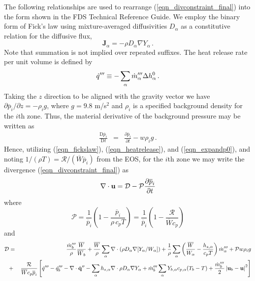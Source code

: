 The following relationships are used to rearrange (\ref{eqn_divconstraint_final}) into
the form shown in the FDS Technical Reference Guide. We employ the binary form of Fick's law using mixture-averaged diffusivities $D_\alpha$ as a constitutive relation for the diffusive flux,
\begin{equation}
\label{eqn_fickslaw}
\mathbf{J}_{\alpha} = - \rho D_\alpha \nabla Y_\alpha \,\mbox{.}
\end{equation}
Note that summation is not implied over repeated suffixes.
The heat release rate per unit volume is defined by
\begin{equation}
\label{eqn_heatrelease}
\dot{q}^{\prime\prime\prime} \equiv -\sum_\alpha \dot{m}_{\alpha}^{\prime\prime\prime} \Delta h^0_\alpha \,\mbox{.}
\end{equation}
Taking the $z$ direction to be aligned with the gravity vector we have $\partial \overline{p}_i/\partial z = -\rho_i g$,
where $g = 9.8$ m/s$^2$ and $\rho_i$ is a specified background density for the $i$th zone.
Thus, the material derivative of the background pressure may be written as
\begin{eqnarray}
\label{eqn_expandp0}
\frac{\mbox{D}\overline{p}_i}{\mbox{D}t} &=& \frac{\partial \overline{p}_i}{\partial t} - w \rho_i g \,\mbox{.}
\end{eqnarray}
Hence, utilizing (\ref{eqn_fickslaw}), (\ref{eqn_heatrelease}), and (\ref{eqn_expandp0}), and noting $1/(\rho T) = \mathcal{R}/(\overline{W} \overline{p}_i)$ from the EOS,
for the $i$th zone we may write the divergence (\ref{eqn_divconstraint_final}) as
\begin{equation}
\label{eqn_fds_divcontraint}
\nabla\cdot \mathbf{u} = \mathcal{D} - \mathcal{P} \frac{\partial \overline{p}_i}{\partial t}
\end{equation}
where
\begin{equation}
\label{eqn_fdsP}
\mathcal{P} = \frac{1}{\overline{p}_i}\left( 1 - \frac{\overline{p}_i}{\rho \,c_p T} \right) = \frac{1}{\overline{p}_i}\left( 1 - \frac{\mathcal{R}}{\overline{W} c_p}  \right)
\end{equation}
and
\begin{eqnarray}
\label{eqn_fdsD}
\mathcal{D} &=& \frac{\dot{m}_b^\tripleprime}{\rho}\frac{\overline{W}}{\overline{W}_b} +
                \frac{\overline{W}}{\rho} \sum_\alpha \Div \left( \rho D_\alpha \nabla[Y_\alpha/W_\alpha] \right) +
                \frac{1}{\rho}\sum_\alpha \left( \frac{\overline{W}}{W_\alpha} - \frac{h_{s,\alpha}}{c_p T} \right) \dot{m}_{\alpha}^\tripleprime  +
                \mathcal{P} w \rho_i g \nonumber \vspace{0.3cm} \\
&+& \frac{\mathcal{R}}{\overline{W} c_p \overline{p}_i} \left[ \dot{q}^\tripleprime - \dq_b''' - \Div \dot{\mathbf{q}}^{\prime\prime} -
                \sum_\alpha h_{s,\alpha} \Div \rho D_\alpha \nabla Y_\alpha + \dot{m}_{b}^{\tripleprime} \sum_\alpha Y_{b,\alpha} c_{p,\alpha}(T_b-T) +
                \frac{\dot{m}_{b}^{\tripleprime}}{2}\left|\mathbf{u}_b-\mathbf{u}\right|^2  \right] \nonumber \vspace{0.3cm} \\
\end{eqnarray}
